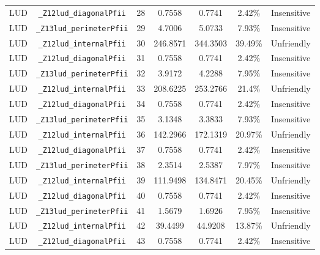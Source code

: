 \documentclass{article}
\begin{document}
\begin{table}[H]
\begin{tabular}{c c c c c c c}
		LUD       & \verb|_Z12lud_diagonalPfii|                    & 28  & 0.7558   & 0.7741        & 2.42\%      & Insensitive \\
		LUD       & \verb|_Z13lud_perimeterPfii|                   & 29  & 4.7006   & 5.0733        & 7.93\%      & Insensitive \\
		LUD       & \verb|_Z12lud_internalPfii|                    & 30  & 246.8571 & 344.3503      & 39.49\%     & Unfriendly  \\
		LUD       & \verb|_Z12lud_diagonalPfii|                    & 31  & 0.7558   & 0.7741        & 2.42\%      & Insensitive \\
		LUD       & \verb|_Z13lud_perimeterPfii|                   & 32  & 3.9172   & 4.2288        & 7.95\%      & Insensitive \\
		LUD       & \verb|_Z12lud_internalPfii|                    & 33  & 208.6225 & 253.2766      & 21.4\%      & Unfriendly  \\
		LUD       & \verb|_Z12lud_diagonalPfii|                    & 34  & 0.7558   & 0.7741        & 2.42\%      & Insensitive \\
		LUD       & \verb|_Z13lud_perimeterPfii|                   & 35  & 3.1348   & 3.3833        & 7.93\%      & Insensitive \\
		LUD       & \verb|_Z12lud_internalPfii|                    & 36  & 142.2966 & 172.1319      & 20.97\%     & Unfriendly  \\
		LUD       & \verb|_Z12lud_diagonalPfii|                    & 37  & 0.7558   & 0.7741        & 2.42\%      & Insensitive \\
		LUD       & \verb|_Z13lud_perimeterPfii|                   & 38  & 2.3514   & 2.5387        & 7.97\%      & Insensitive \\
		LUD       & \verb|_Z12lud_internalPfii|                    & 39  & 111.9498 & 134.8471      & 20.45\%     & Unfriendly  \\
		LUD       & \verb|_Z12lud_diagonalPfii|                    & 40  & 0.7558   & 0.7741        & 2.42\%      & Insensitive \\
		LUD       & \verb|_Z13lud_perimeterPfii|                   & 41  & 1.5679   & 1.6926        & 7.95\%      & Insensitive \\
		LUD       & \verb|_Z12lud_internalPfii|                    & 42  & 39.4499  & 44.9208       & 13.87\%     & Unfriendly  \\
		LUD       & \verb|_Z12lud_diagonalPfii|                    & 43  & 0.7558   & 0.7741        & 2.42\%      & Insensitive \\

\end{tabular}
\end{table}
\end{document}
